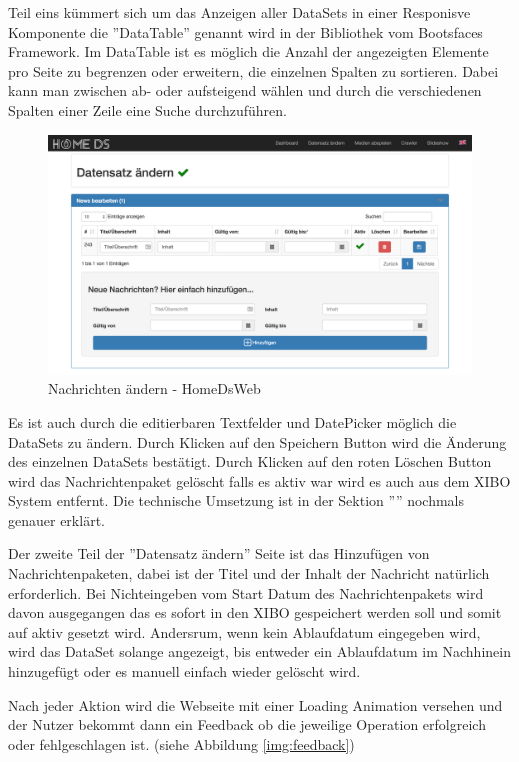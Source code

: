 Teil eins kümmert sich um das Anzeigen aller DataSets in einer Responisve Komponente die ''DataTable'' genannt wird in der Bibliothek vom Bootsfaces Framework. Im DataTable ist es möglich die Anzahl der angezeigten Elemente pro Seite zu begrenzen oder erweitern, die einzelnen Spalten zu sortieren. Dabei kann man zwischen ab- oder aufsteigend wählen und durch die verschiedenen Spalten einer Zeile eine Suche durchzuführen. 

\begin{figure}[H]
\centering
\includegraphics[width=1\textwidth]{images/08_HomeDsWeb/NachrichtenPaket.png}
\caption{Nachrichten ändern - HomeDsWeb}
\label{img:changenews}
\end{figure}


Es ist auch durch die editierbaren Textfelder und DatePicker möglich die DataSets zu ändern. Durch Klicken auf den Speichern Button wird die Änderung des einzelnen DataSets bestätigt. Durch Klicken auf den roten Löschen Button wird das Nachrichtenpaket gelöscht falls es aktiv war wird es auch aus dem XIBO System entfernt. Die technische Umsetzung ist in der Sektion '''' nochmals genauer erklärt. 

Der zweite Teil der ''Datensatz ändern'' Seite ist das Hinzufügen von Nachrichtenpaketen, dabei ist der Titel und der Inhalt der Nachricht natürlich erforderlich. Bei Nichteingeben vom Start Datum des Nachrichtenpakets wird davon ausgegangen das es sofort in den XIBO gespeichert werden soll und somit auf aktiv gesetzt wird. Andersrum, wenn kein Ablaufdatum eingegeben wird, wird das DataSet solange angezeigt, bis entweder ein Ablaufdatum im Nachhinein hinzugefügt oder es manuell einfach wieder gelöscht wird.

Nach jeder Aktion wird die Webseite mit einer Loading Animation versehen und der Nutzer bekommt dann ein Feedback ob die jeweilige Operation erfolgreich oder fehlgeschlagen ist. (siehe Abbildung \ref{img:feedback})

